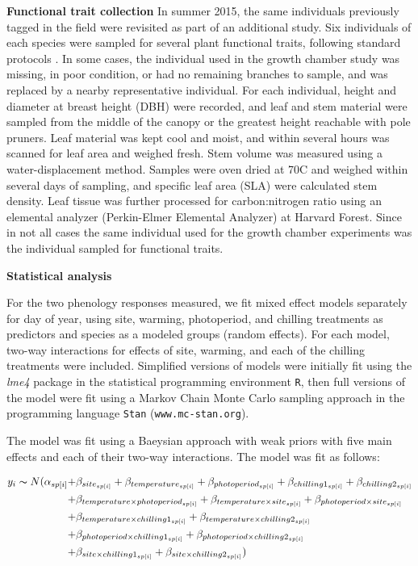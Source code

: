 \documentclass[11pt]{article}
\begin{document}
\textbf{Functional trait collection}
In summer 2015, the same individuals previously tagged in the field were revisited as part of an additional study. Six individuals of each species were sampled for several plant functional traits, following standard protocols \cite{Perez-Harguindeguy:2013aa}. In some cases, the individual used in the growth chamber study was missing, in poor condition, or had no remaining branches to sample, and was replaced by a nearby representative individual. For each individual, height and diameter at breast height (DBH) were recorded, and leaf and stem material were sampled from the middle of the canopy or the greatest height reachable with pole pruners. Leaf material was kept cool and moist, and within several hours was scanned for leaf area and weighed fresh. Stem volume was measured using a water-displacement method. Samples were oven dried at 70\degree C and weighed within several days of sampling, and specific leaf area (SLA) were calculated stem density. Leaf tissue was further processed for carbon:nitrogen ratio using an elemental analyzer (Perkin-Elmer Elemental Analyzer) at Harvard Forest. Since in not all cases the same individual used for the growth chamber experiments was the individual sampled for functional traits.

\textbf{Statistical analysis}

For the two phenology responses measured, we fit mixed effect models separately for day of year, using site, warming, photoperiod, and chilling treatments as predictors and species as a modeled groups (random effects). For each model, two-way interactions for effects of site, warming, and each of the chilling treatments were included. Simplified versions of models were initially fit using the \emph{lme4} package in the statistical programming environment \texttt{R}, then full versions of the model were fit using a Markov Chain Monte Carlo sampling approach in the programming language \texttt{Stan} \cite{Carpenter:2016aa}(\texttt{www.mc-stan.org}).

The model was fit using a Baeysian approach with weak priors with five main effects and each of their two-way interactions. The model was fit as follows:

\begin{align*}
y_i \thicksim N(\alpha_{sp[i]} +& \beta_{site_{sp[i]}} + \beta_{temperature_{sp[i]}} + \beta_{photoperiod_{sp[i]}} + \beta_{chilling1_{sp[i]}} + \beta_{chilling2_{sp[i]}}  \\
	+& \beta_{temperature \times photoperiod_{sp[i]}} + \beta_{temperature \times site_{sp[i]}} + \beta_{photoperiod \times site_{sp[i]}} \\
	+& \beta_{temperature \times chilling1_{sp[i]}} + \beta_{temperature \times chilling2_{sp[i]}} \\
	+& \beta_{photoperiod \times chilling1_{sp[i]}} + \beta_{photoperiod \times chilling2_{sp[i]}} \\
	+& \beta_{site \times chilling1_{sp[i]}}  + \beta_{site \times chilling2_{sp[i]}} )
\end{align*}
\end{document}

